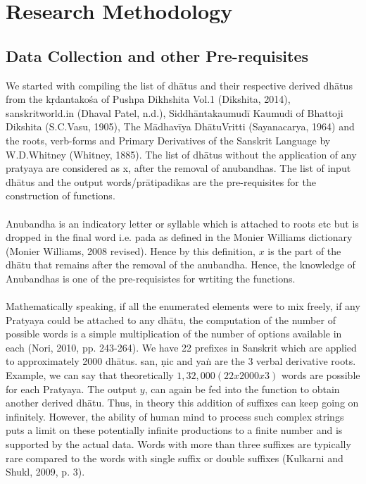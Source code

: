 \chapter{Research Methodology}
\label{sec:3}
\section{Data Collection and other Pre-requisites}
We started with compiling the list of dhātus and their respective derived dhātus from the kṛdantakośa of Pushpa Dikhshita Vol.1 (Dikshita, 2014), sanskritworld.in (Dhaval Patel, n.d.), Siddhāntakaumudī Kaumudi of Bhattoji Dikshita (S.C.Vasu, 1905), The Mādhavīya DhātuVritti (Sayanacarya, 1964) and the roots, verb-forms and Primary Derivatives of the Sanskrit Language by W.D.Whitney (Whitney, 1885). The list of dhātus without the application of any pratyaya are considered as x, after the removal of anubandhas. The list of input dhātus and the output words/prātipadikas are the pre-requisites for the construction of functions.\\\\
Anubandha is an indicatory letter or syllable which is attached to roots etc but is dropped in the final word i.e. pada as defined in the Monier Williams dictionary (Monier Williams, 2008 revised). Hence by this definition, $x$ is the part of the dhātu that remains after the removal of the anubandha. Hence, the knowledge of Anubandhas is one of the pre-requisistes for wrtiting the functions.\\\\
Mathematically speaking, if all the enumerated elements were to mix freely, if any Pratyaya could be attached to any dhātu, the computation of the number of possible words is a simple multiplication of the number of options available in each (Nori, 2010, pp. 243-264). We have 22 prefixes in Sanskrit which are applied to approximately 2000 dhātus. san, ṇic and yaṅ are the 3 verbal derivative roots. Example, we can say that theoretically $1,32,000 (22 x 2000 x 3)$ words are possible for each Pratyaya.
The output $y$, can again be fed into the function to obtain another derived dhātu. Thus, in theory this addition of suffixes can keep going on infinitely. However, the ability of human mind to process such complex strings puts a limit on these potentially infinite productions to a finite number and is supported by the actual data. Words with more than three suffixes are typically rare compared to the words with single suffix or double suffixes (Kulkarni and Shukl, 2009, p. 3).\\\\


